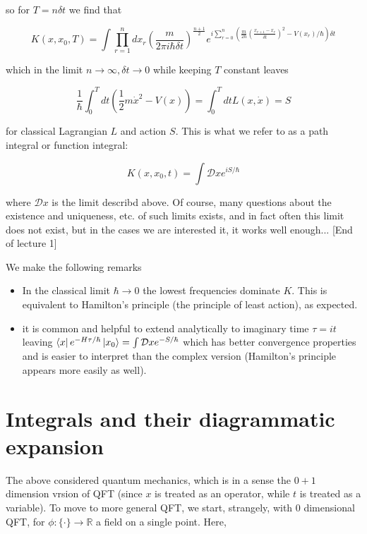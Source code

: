 \documentclass{article}
\theoremstyle{definition}
\begin{document}
so for $T = n \delta t$ we find that

\begin{equation}
  K(x, x_0, T) = \int \prod_{r = 1}^n dx_r \left( \frac{m}{2\pi i \hbar \delta t} \right)^{\frac{n + 1}{2}}
  e^{i \sum_{r = 0}^n \left( \frac{m}{2 \hbar} \left( \frac{x_{r + 1} - x_r}{\delta t} \right)^2
      - V(x_r) / \hbar \right) \delta t}
\end{equation}

which in the limit $n \to \infty, \delta t \to 0$ while keeping $T$ constant
leaves

\begin{equation}
  \frac{1}{\hbar} \int_0^T dt \left( \frac{1}{2}m \dot{x}^2 - V(x) \right) = \int_0^T dt L(x, \dot{x}) = S
\end{equation}

for classical Lagrangian $L$ and action $S$. This is what we refer to as a path
integral or function integral:

\begin{equation}
  K(x, x_0, t) = \int \mathcal{D}x e^{i S / \hbar}
\end{equation}

where $\mathcal{D} x$ is the limit describd above. Of course, many questions
about the existence and uniqueness, etc. of such limits exists, and in fact
often this limit does not exist, but in the cases we are interested it, it works
well enough... [End of lecture 1]

We make the following remarks

\begin{itemize}
\item In the classical limit $\hbar \to 0$ the lowest frequencies
  dominate $K$. This is equivalent to Hamilton's principle (the principle of
  least action), as expected.
\item it is common and helpful to extend analytically to imaginary time $\tau =
  it$ leaving $\bra{x} e^{-H\tau / \hbar} \ket{x_0} = \int \mathcal{D}x e^{-S /
    \hbar}$ which has better convergence properties and is easier to interpret
  than the complex version (Hamilton's principle appears more easily as well). 
\end{itemize}

\section{Integrals and their diagrammatic expansion}

The above considered quantum mechanics, which is in a sense the $0 + 1$
dimension vrsion of QFT (since $x$ is treated as an operator, while $t$ is
treated as a variable). To move to more general QFT, we start, strangely, with 0
dimensional QFT, for $\phi : \{ \cdot \} \to \mathbb{R}$ a field on a single
point. Here,
\end{document}
